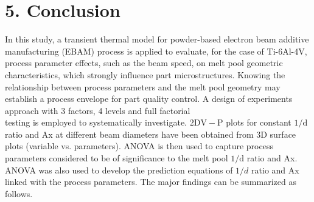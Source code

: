 \documentclass[10pt]{article}
\begin{document}
\section*{5. Conclusion}
In this study, a transient thermal model for powder-based electron beam additive manufacturing (EBAM) process is applied to evaluate, for the case of Ti-6Al-4V, process parameter effects, such as the beam speed, on melt pool geometric characteristics, which strongly influence part microstructures. Knowing the relationship between process parameters and the melt pool geometry may establish a process envelope for part quality control. A design of experiments approach with 3 factors, 4 levels and full factorial\\
testing is employed to systematically investigate. $2 \mathrm{D} \mathrm{V}-\mathrm{P}$ plots for constant $1 / \mathrm{d}$ ratio and Ax at different beam diameters have been obtained from 3D surface plots (variable vs. parameters). ANOVA is then used to capture process parameters considered to be of significance to the melt pool $1 / \mathrm{d}$ ratio and Ax. ANOVA was also used to develop the prediction equations of $1 / d$ ratio and Ax linked with the process parameters. The major findings can be summarized as follows.
\end{document}
